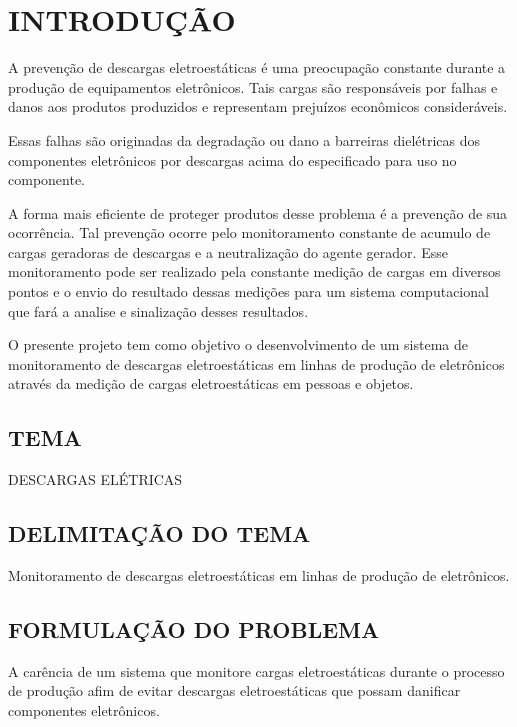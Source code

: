 \documentclass[
	12pt,				%
	openright,			%
	oneside,			%
	a4paper,			%
	chapter=TITLE,		%
	english,			%
	french,				%
	spanish,			%
	brazil,				%
	article,			%
	]{uea-abntex2}
\begin{document}
\newpage

\chapter*{\vspace*{3.4cm}INTRODUÇÃO}
A prevenção de descargas eletroestáticas é uma preocupação constante durante a produção de equipamentos eletrônicos. Tais cargas são responsáveis por falhas e danos aos produtos produzidos e representam prejuízos econômicos consideráveis.

Essas falhas são originadas da degradação ou dano a barreiras dielétricas dos componentes eletrônicos por descargas acima do especificado para uso no componente.

A forma mais eficiente de proteger produtos desse problema é a prevenção de sua ocorrência. Tal prevenção ocorre pelo monitoramento constante de acumulo de cargas geradoras de descargas e a neutralização do agente gerador.
Esse monitoramento pode ser realizado pela constante medição de cargas em diversos pontos e o envio do resultado dessas medições para um sistema computacional que fará a analise e sinalização desses resultados. 

O presente projeto tem como objetivo o desenvolvimento de um sistema de monitoramento de descargas eletroestáticas em linhas de produção de eletrônicos através da medição de cargas eletroestáticas em pessoas e objetos.


\newpage

\vspace{24pt}
\section{TEMA}
DESCARGAS ELÉTRICAS
\section{DELIMITAÇÃO DO TEMA}
Monitoramento de descargas eletroestáticas em linhas de produção de eletrônicos.
\section{FORMULAÇÃO DO PROBLEMA}
A carência de um sistema que monitore cargas eletroestáticas durante o processo de produção afim de evitar descargas eletroestáticas que possam danificar componentes eletrônicos.  
\end{document}

